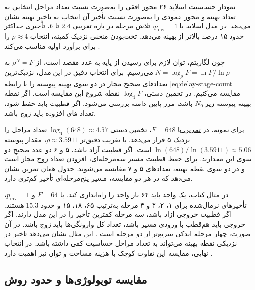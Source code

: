 نمودار حساسیت اسلاید ۲۶ محور افقی را به‌صورت نسبت تعداد مراحل
انتخابی به تعداد بهینه و محور عمودی را به‌صورت نسبت تأخیر
آن انتخاب به تأخیر بهینه نشان می‌دهد. در مدل اسلاید با
\(p_{\mathrm{inv}}=1\)، تلاش مرحله در بازه تقریبی \(2.4\) تا \(6\)،
تأخیری حداکثر حدود ۱۵ درصد بالاتر از بهینه می‌دهد. تخت‌بودن
منحنی نزدیک کمینه، انتخاب \(\rho\approx4\) را برای برآورد
اولیه مناسب می‌کند \cite[شکل ، صفحه ۱۶۷]{weste}
\cite[اسلاید ۲۶]{logicaleffortslides}.

چون لگاریتم، توان لازم برای رسیدن از پایه به عدد مقصد است،
از \(\rho^N=F\) به \(N=\log_\rho F=\ln F/\ln\rho\)
می‌رسیم. برای انتخاب دقیق در این مدل، نزدیک‌ترین تعدادهای
صحیح مجاز در دو سوی بهینه پیوسته را با رابطه
\eqref{eq:delay-stage-count} مقایسه می‌کنیم.
در تخمین دستی، \(\log_4 F\) نقطه شروع این مقایسه است.
اگر نقطه بهینه پیوسته زیر \(N_0\) باشد، مرز پایین دامنه
بررسی می‌شود. اگر قطبیت باید حفظ شود، تعداد
های افزوده باید زوج باشد.

برای نمونه، در \hyperref[sec:delay-exercise-stage-count]{تمرین
} با \(F=648\)، تخمین دستی \(\log_4(648)\approx4.67\)
تعداد مراحل را نزدیک ۵ قرار می‌دهد. با تقریب دقیق‌تر
\(\rho\approx3.5911\)، مقدار پیوسته
\(\ln(648)/\ln(3.5911)\approx5.06\) است. اگر قطبیت آزاد
باشد، ۵ و ۶ دو عدد صحیحِ دو سوی این مقدارند. برای حفظ قطبیت
مسیر سه‌مرحله‌ای، افزودن تعداد زوج  مجاز است و
در دو سوی نقطه بهینه، تعدادهای ۵ و ۷ مقایسه می‌شوند.
جدول همان تمرین نشان می‌دهد که در هر دو مقایسه، مسیر
پنج‌مرحله‌ای تأخیر کم‌تری دارد.

در مثال  کتاب، یک  واحد باید ۶۴ بار
واحد را راه‌اندازی کند. با \(F=64\) و \(p_{\mathrm{inv}}=1\)،
تأخیرهای نرمال‌شده برای ۱، ۲، ۳ و ۴ مرحله به‌ترتیب
۶۵، ۱۸، ۱۵ و حدود \num{15.3} هستند. اگر قطبیت خروجی آزاد باشد،
سه مرحله کمترین تأخیر را در این مدل دارند. اگر خروجی باید
هم‌قطب با ورودی مسیر باشد، تعداد کل وارونگی‌ها باید زوج باشد.
در آن صورت، چهار مرحله اندکی سریع‌تر از دو مرحله است
\cite[مثال  و شکل ، صفحه ۱۶۶]{weste}.
این مثال نشان می‌دهد تأخیر در نزدیکی نقطه بهینه می‌تواند به
تعداد مراحل حساسیت کمی داشته باشد. در انتخاب نهایی، مقایسه
این تفاوت کوچک با هزینه مساحت و توان نیز اهمیت دارد
\cite[شکل ، صفحه ۱۶۷]{weste}
\cite[اسلاید ۲۶]{logicaleffortslides}.

\subsection{مقایسه توپولوژی‌ها و حدود روش}
\label{sec:delay-path-limits}


